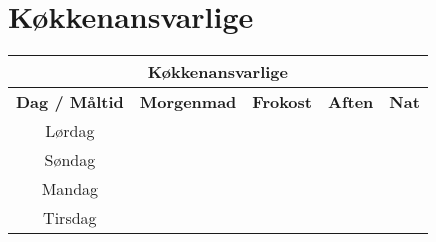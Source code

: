 \section{Køkkenansvarlige}
\begin{center}
\begin{tabularx}{0.7\textwidth}{|c|X|X|X|X|}
\hline \multicolumn{5}{|c|}{\textbf{Køkkenansvarlige}} \\
\hline \textbf{Dag / Måltid} & \textbf{Morgenmad} & \textbf{Frokost} & \textbf{Aften} & \textbf{Nat} \\
\hline
\hline Lørdag   &  &  &  &  \\
\hline Søndag   &  &  &  &  \\
\hline Mandag   &  &  &  &  \\
\hline Tirsdag  &  &  &  &  \\
\hline
\end{tabularx}
\end{center}
